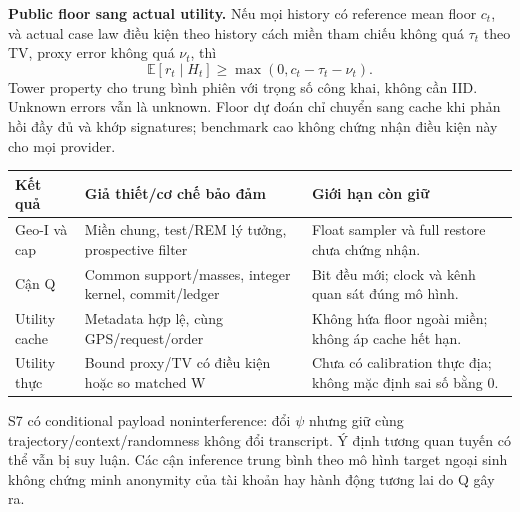 \textbf{Public floor sang actual utility.} Nếu mọi history có reference mean floor $c_t$, và actual case law
điều kiện theo history cách miền tham chiếu không quá $\tau_t$ theo TV, proxy error không quá $\nu_t$, thì
\begin{equation}
\mathbb E[r_t\mid H_t]\ge\max(0,c_t-\tau_t-\nu_t).
\label{eq:transfer}
\end{equation}
Tower property cho trung bình phiên với trọng số công khai, không cần IID. Unknown errors vẫn là unknown.
Floor dự đoán chỉ chuyển sang cache khi phản hồi đầy đủ và khớp signatures; benchmark cao không chứng nhận điều kiện này cho mọi provider.

\begin{tabularx}{\linewidth}{@{}P{3cm}P{5.4cm}Y@{}}\toprule
\textbf{Kết quả} & \textbf{Giả thiết/cơ chế bảo đảm} & \textbf{Giới hạn còn giữ}\\\midrule
Geo-I và cap & Miền chung, test/REM lý tưởng, prospective filter & Float sampler và full restore chưa chứng nhận.\\
Cận Q & Common support/masses, integer kernel, commit/ledger & Bit đều mới; clock và kênh quan sát đúng mô hình.\\
Utility cache & Metadata hợp lệ, cùng GPS/request/order & Không hứa floor ngoài miền; không áp cache hết hạn.\\
Utility thực & Bound proxy/TV có điều kiện hoặc so matched W & Chưa có calibration thực địa; không mặc định sai số bằng 0.\\\bottomrule
\end{tabularx}
S7 có conditional payload noninterference: đổi $\psi$ nhưng giữ cùng trajectory/context/randomness không đổi transcript.
Ý định tương quan tuyến có thể vẫn bị suy luận. Các cận inference trung bình theo mô hình target ngoại sinh
không chứng minh anonymity của tài khoản hay hành động tương lai do Q gây ra.


\clearpage
